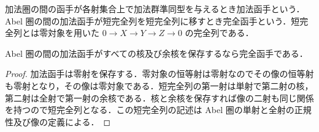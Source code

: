 \begin{defn}[加法函手と完全函手]
加法圏の間の函手が各射集合上で加法群準同型を与えるとき加法函手という．Abel 圏の間の加法函手が短完全列を短完全列に移すとき完全函手という．短完全列とは零対象を用いた $0\to X\to Y\to Z\to0$ の完全列である．
\end{defn}
\begin{prop}[核と余核による完全性の判定]
Abel 圏の間の加法函手がすべての核及び余核を保存するなら完全函手である．
\end{prop}
\begin{proof}
加法函手は零射を保存する．零対象の恒等射は零射なのでその像の恒等射も零射となり，その像は零対象である．短完全列の第一射は単射で第二射の核，第二射は全射で第一射の余核である．核と余核を保存すれば像の二射も同じ関係を持つので短完全列となる．この短完全列の記述は Abel 圏の単射と全射の正規性及び像の定義による．
\end{proof}
